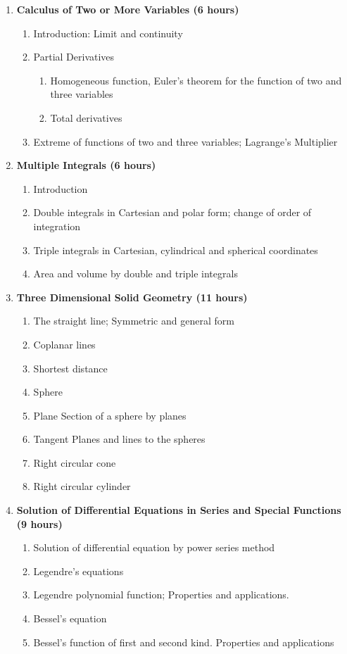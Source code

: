\begin{enumerate}
    \item \textbf{Calculus of Two or More Variables \hfill (6 hours)}
    \begin{enumerate}
        \item Introduction: Limit and continuity
        \item Partial Derivatives
        \begin{enumerate}
            \item Homogeneous function, Euler's theorem for the function of two and three variables
            \item Total derivatives
        \end{enumerate}
        \item Extreme of functions of two and three variables; Lagrange's Multiplier
    \end{enumerate}
    
    \item \textbf{Multiple Integrals \hfill (6 hours)}
    \begin{enumerate}
        \item Introduction
        \item Double integrals in Cartesian and polar form; change of order of integration
        \item Triple integrals in Cartesian, cylindrical and spherical coordinates
        \item Area and volume by double and triple integrals
    \end{enumerate}
    
    \item \textbf{Three Dimensional Solid Geometry \hfill (11 hours)}
    \begin{enumerate}
        \item The straight line; Symmetric and general form
        \item Coplanar lines
        \item Shortest distance
        \item Sphere
        \item Plane Section of a sphere by planes
        \item Tangent Planes and lines to the spheres
        \item Right circular cone
        \item Right circular cylinder
    \end{enumerate}
    
    \item \textbf{Solution of Differential Equations in Series and Special Functions \hfill (9 hours)}
    \begin{enumerate}
        \item Solution of differential equation by power series method
        \item Legendre's equations
        \item Legendre polynomial function; Properties and applications.
        \item Bessel's equation
        \item Bessel's function of first and second kind. Properties and applications
    \end{enumerate}
    

\end{enumerate}
